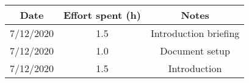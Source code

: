 \documentclass[../../main.tex]{subfiles}
\begin{document}
\begin{center}
    \begin{tabular}{|c| |c| |c|} 
        \hline
        Date & Effort spent (h) & Notes\\ [0.5ex] 
        \hline\hline
        7/12/2020 & 1.5 & Introduction briefing\\ 
        7/12/2020 & 1.0 & Document setup\\
        7/12/2020 & 1.5 & Introduction\\
        \hline
    \end{tabular}
\end{center}
\end{document}
